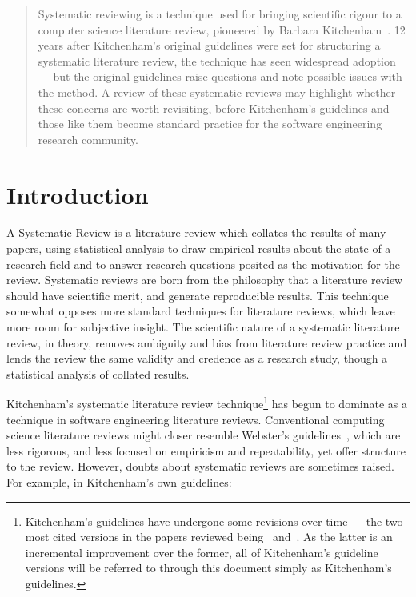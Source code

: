 

\maketitle

\begin{abstract}
Systematic reviewing is a technique used for bringing scientific rigour to a computer science literature review, pioneered by Barbara Kitchenham~\citep{Kitchenham2004}. 12 years after Kitchenham's original guidelines were set for structuring a systematic literature review, the technique has seen widespread adoption --- but the original guidelines raise questions and note possible issues with the method. A review of these systematic reviews may highlight whether these concerns are worth revisiting, before Kitchenham's guidelines and those like them become standard practice for the software engineering research community.
\end{abstract}

\section{Introduction}
A Systematic Review is a literature review which collates the results of many papers, using statistical analysis to draw empirical results about the state of a research field and to answer research questions posited as the motivation for the review. Systematic reviews are born from the philosophy that a literature review should have scientific merit, and generate reproducible results. This technique somewhat opposes more standard techniques for literature reviews, which leave more room for subjective insight. The scientific nature of a systematic literature review, in theory, removes ambiguity and bias from literature review practice and lends the review the same validity and credence as a research study, though a statistical analysis of collated results.\par

Kitchenham's systematic literature review technique\footnote{Kitchenham's guidelines have undergone some revisions over time --- the two most cited versions in the papers reviewed being~\cite{Kitchenham2004} and~\cite{Kitchenham2007}. As the latter is an incremental improvement over the former, all of Kitchenham's guideline versions will be referred to through this document simply as Kitchenham's guidelines.} has begun to dominate as a technique in software engineering literature reviews. Conventional computing science literature reviews might closer resemble Webster's guidelines~\citep{Webster2002}, which are less rigorous, and less focused on empiricism and repeatability, yet offer structure to the review. However, doubts about systematic reviews are sometimes raised. For example, in Kitchenham's own guidelines:

